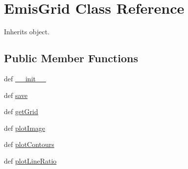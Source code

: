 \hypertarget{classpyneb_1_1core_1_1emis_grid_1_1_emis_grid}{\section{Emis\-Grid Class Reference}
\label{classpyneb_1_1core_1_1emis_grid_1_1_emis_grid}
}


Inherits object.

\subsection*{Public Member Functions}
\begin{DoxyCompactItemize}
\item 
def \hyperlink{classpyneb_1_1core_1_1emis_grid_1_1_emis_grid_ac775ee34451fdfa742b318538164070e}{\-\_\-\-\_\-init\-\_\-\-\_\-}
\item 
def \hyperlink{classpyneb_1_1core_1_1emis_grid_1_1_emis_grid_aba0970ece8740693d3b82e656500a9c0}{save}
\item 
def \hyperlink{classpyneb_1_1core_1_1emis_grid_1_1_emis_grid_abf8bcfd00d269e5ac521beddcf24b058}{get\-Grid}
\item 
def \hyperlink{classpyneb_1_1core_1_1emis_grid_1_1_emis_grid_a75696b7d02c1de3800fa193cc32410ab}{plot\-Image}
\item 
def \hyperlink{classpyneb_1_1core_1_1emis_grid_1_1_emis_grid_ad95683e398da9fe1a5a6e7a3e2e3cd1c}{plot\-Contours}
\item 
def \hyperlink{classpyneb_1_1core_1_1emis_grid_1_1_emis_grid_a1bc8674b481362d418b8b3de0b284c81}{plot\-Line\-Ratio}
\end{DoxyCompactItemize}
